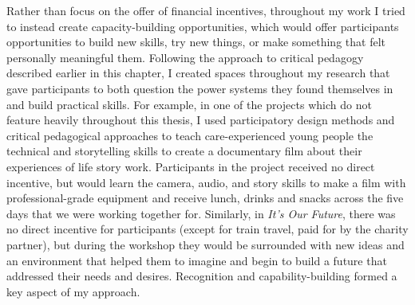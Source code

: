 Rather than focus on the offer of financial incentives, throughout my work I tried to instead create capacity-building opportunities, which would offer participants opportunities to build new skills, try new things, or make something that felt personally meaningful them. Following the approach to critical pedagogy described earlier in this chapter, I created spaces throughout my research that gave participants to both question the power systems they found themselves in and build practical skills. For example, in one of the projects which do not feature heavily throughout this thesis, I used participatory design methods and critical pedagogical approaches to teach care-experienced young people the technical and storytelling skills to create a documentary film about their experiences of life story work. Participants in the project received no direct incentive, but would learn the camera, audio, and story skills to make a film with professional-grade equipment and receive lunch, drinks and snacks across the five days that we were working together for. Similarly, in \emph{It’s Our Future}, there was no direct incentive for participants (except for train travel, paid for by the charity partner), but during the workshop they would be surrounded with new ideas and an environment that helped them to imagine and begin to build a future that addressed their needs and desires. Recognition and capability-building formed a key aspect of my approach. 


